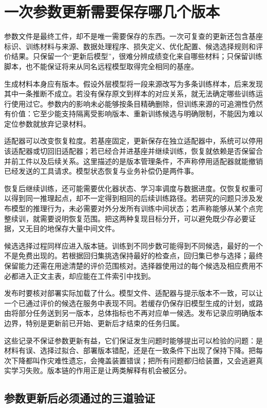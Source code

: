 \section{一次参数更新需要保存哪几个版本}
\label{sec:ch10-artifactchain}

参数文件是最终工件，却不是唯一需要保存的东西。一次可复查的更新还包含基座标识、训练材料与来源、数据处理程序、损失定义、优化配置、候选选择规则和评价结果。只保留一个“更新后模型”，很难分辨成绩变化来自哪些材料；只保留训练脚本，也不能保证将来从同名远程模型取得完全相同的基座。

生成材料本身应有版本。假设外层模型将一段来源改写为多条训练样本，后来发现其中一条推断不成立。若没有保存原文到样本的对应关系，就无法确定哪些训练运行使用过它。参数内的影响未必能够按条目精确删除，但训练来源的可追溯性仍然有价值：它至少能支持隔离受影响版本、重新训练候选与明确限制，不能因为难以定位参数就放弃记录材料。

适配器可以改变恢复粒度。若基座固定，更新保存在独立适配器中，系统可以停用该适配器或切回旧适配器；若已经合并进基座并继续训练，恢复就依赖是否保留合并前工件以及后续关系。这里描述的是版本管理条件，不声称停用适配器就能撤销已经发送的工具请求。模型状态恢复与业务补偿仍是两件事。

恢复后继续训练，还可能需要优化器状态、学习率调度与数据进度。仅恢复权重可以得到同一推理起点，却不一定得到相同的后续训练路径。若研究的问题只涉及发布模型的推理行为，未必需要对外分发所有训练中间状态；若声称能够从某个点完整续训，就需要说明恢复范围。把这两种复现目标分开，可以避免既少存必要证据，又无目的地保存大量中间文件。

候选选择过程同样应进入版本链。训练到不同步数可能得到不同候选，最好的一个不是免费出现的。若根据回归集挑选保持最好的检查点，回归集已参与选择；最终保留能力还需在用途清楚的评价范围核对。选择器使用过的每个候选及相应费用不必都进入正文主表，却应能在工件索引中找到。

发布时要核对部署实际加载了什么。模型文件、适配器与提示版本不一致，可以让一个已通过评价的候选在服务中表现不同。若缓存仍保存旧模型生成的计划，或路由将部分任务送到另一版本，总体指标也不再对应单一候选。发布记录应明确版本边界，特别是更新前已开始、更新后才结束的任务归属。

这些记录不保证参数更新有益，它们保证发生问题时能够提出可以检验的问题：是材料有误、选择过拟合、部署版本错配，还是在一致条件下出现了保持下降。把每次下降都叫作灾难性遗忘，会掩盖装置错误；把所有问题都归给装置，又会逃避真实学习失败。版本链的作用正是让两类解释有机会被区分。

\subsection{参数更新后必须通过的三道验证}
\label{sec:ch10-gate}

